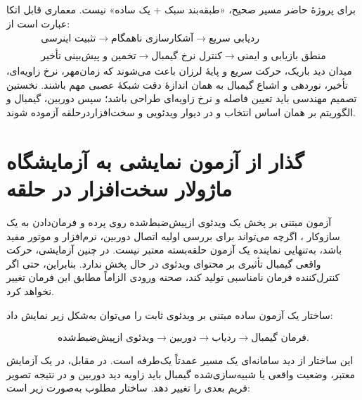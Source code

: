 \documentclass[12pt,a4paper]{article}
\newcommand{\EN}[1]{\lr{#1}}
\begin{document}
\begin{keybox}
برای پروژهٔ حاضر مسیر صحیح، «طبقه‌بند سبک + یک \EN{PID} ساده» نیست. معماری قابل اتکا عبارت است از:
\[
\boxed{
\begin{gathered}
\text{تثبیت اینرسی}
\rightarrow
\text{آشکارسازی ناهمگام}
\rightarrow
\text{ردیابی سریع}
\\[2mm]
\text{تخمین و پیش‌بینی تأخیر}
\rightarrow
\text{کنترل نرخ گیمبال}
\rightarrow
\text{منطق بازیابی و ایمنی}
\end{gathered}
}
\]
میدان دید باریک، حرکت سریع و پایهٔ لرزان باعث می‌شوند که زمان‌مهر، نرخ زاویه‌ای، تأخیر، نوردهی و اشباع گیمبال به همان اندازهٔ دقت شبکهٔ عصبی مهم باشند. نخستین تصمیم مهندسی باید تعیین فاصله و نرخ زاویه‌ای طراحی باشد؛ سپس دوربین، گیمبال و الگوریتم بر همان اساس انتخاب و در دیوار ویدئویی و سخت‌افزاردرحلقه آزموده شوند.
\end{keybox}






\section{گذار از آزمون نمایشی به آزمایشگاه ماژولار سخت‌افزار در حلقه}
\label{sec:modular_eo_hil}

آزمون مبتنی بر پخش یک ویدئوی ازپیش‌ضبط‌شده روی پرده و فرمان‌دادن
به یک سازوکار ، اگرچه می‌تواند برای بررسی اولیه
اتصال دوربین، نرم‌افزار و موتور مفید باشد، به‌تنهایی نماینده یک
آزمون حلقه‌بسته معتبر نیست. در چنین آزمایشی، حرکت واقعی گیمبال
تأثیری بر محتوای ویدئوی در حال پخش ندارد. بنابراین، حتی اگر
کنترل‌کننده فرمان نامناسبی تولید کند، صحنه ورودی الزاماً مطابق
این فرمان تغییر نخواهد کرد.

ساختار یک آزمون ساده مبتنی بر ویدئوی ثابت را می‌توان به‌شکل زیر
نمایش داد:

\begin{equation}
	\text{ویدئوی ازپیش‌ضبط‌شده}
	\longrightarrow
	\text{دوربین}
	\longrightarrow
	\text{ردیاب}
	\longrightarrow
	\text{فرمان گیمبال}.
	\label{eq:open_loop_video_test}
\end{equation}

این ساختار از دید سامانه‌ای یک مسیر عمدتاً یک‌طرفه است. در مقابل،
در یک آزمایش معتبر، وضعیت واقعی یا شبیه‌سازی‌شده گیمبال باید زاویه
دید دوربین و در نتیجه تصویر فریم بعدی را تغییر دهد. ساختار مطلوب
به‌صورت زیر است:
\end{document}
